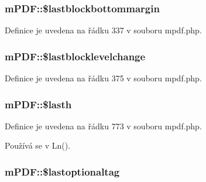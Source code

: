 \hypertarget{classm_p_d_f_a65fbc82c6cdf8794e1e55f4295e29577}{
\subsubsection[{\$lastblockbottommargin}]{\setlength{\rightskip}{0pt plus 5cm}m\-P\-D\-F\-::\$lastblockbottommargin}}\label{classm_p_d_f_a65fbc82c6cdf8794e1e55f4295e29577}


Definice je uvedena na řádku 337 v souboru mpdf.\-php.

\hypertarget{classm_p_d_f_ad7988e0646816181d5788beffbeb1f9f}{
\subsubsection[{\$lastblocklevelchange}]{\setlength{\rightskip}{0pt plus 5cm}m\-P\-D\-F\-::\$lastblocklevelchange}}\label{classm_p_d_f_ad7988e0646816181d5788beffbeb1f9f}


Definice je uvedena na řádku 375 v souboru mpdf.\-php.

\hypertarget{classm_p_d_f_a58c5820a6b4c747b368a2af036e5e252}{
\subsubsection[{\$lasth}]{\setlength{\rightskip}{0pt plus 5cm}m\-P\-D\-F\-::\$lasth}}\label{classm_p_d_f_a58c5820a6b4c747b368a2af036e5e252}


Definice je uvedena na řádku 773 v souboru mpdf.\-php.



Používá se v Ln().

\hypertarget{classm_p_d_f_aa689ef8307ff92c40324b87d0ad8067f}{
\subsubsection[{\$lastoptionaltag}]{\setlength{\rightskip}{0pt plus 5cm}m\-P\-D\-F\-::\$lastoptionaltag}}\label{classm_p_d_f_aa689ef8307ff92c40324b87d0ad8067f}



